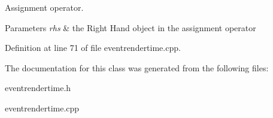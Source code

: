 Assignment operator. 


\begin{DoxyParams}{Parameters}
{\em rhs} & the Right Hand object in the assignment operator \\
\hline
\end{DoxyParams}


Definition at line 71 of file eventrendertime.cpp.



The documentation for this class was generated from the following files:\begin{DoxyCompactItemize}
\item 
eventrendertime.h\item 
eventrendertime.cpp\end{DoxyCompactItemize}
